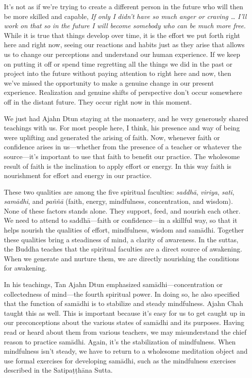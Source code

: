 It's not as if we're trying to create a different person in the future 
who will then be more skilled and capable, \emph{If only I didn't have 
so much anger or craving \ldots{} I'll work on that so in the future I 
will become somebody who can be much more free.} While it is true that 
things develop over time, it is the effort we put forth right here and 
right now, seeing our reactions and habits just as they arise that 
allows us to change our perceptions and understand our human 
experience. If we keep on putting it off or spend time regretting all 
the things we did in the past or project into the future without paying 
attention to right here and now, then we've missed the opportunity to 
make a genuine change in our present experience. Realization and 
genuine shifts of perspective don't occur somewhere off in the distant 
future. They occur right now in this moment.


We just had Ajahn Dtun staying at the monastery, and he very generously 
shared teachings with us. For most people here, I think, his presence 
and way of being were uplifting and generated the arising of faith. 
Now, whenever faith or confidence arises in us---whether from the 
presence of a teacher or whatever the source---it's important to use 
that faith to benefit our practice. The wholesome result of faith is 
the inclination to apply effort or energy. In this way faith is 
nourishment for effort and energy in our practice.

These two qualities are among the five spiritual faculties: 
\emph{saddhā}, \emph{viriya}, \emph{sati}, \emph{samādhi}, and 
\emph{paññā} (faith, energy, mindfulness, concentration, and 
wisdom). None of these factors stands alone. They support, feed, and 
nourish each other. We need to attend to saddhā---faith or 
confidence---in a skillful way, so that it helps nourish the qualities 
of effort, mindfulness, wisdom and samādhi. Together these qualities 
bring a steadiness of mind, a clarity of awareness. In the suttas, the 
Buddha teaches that the spiritual faculties are a direct source of 
awakening. When we generate and nurture them, we are directly 
nourishing the conditions for awakening.

In his teachings, Tan Ajahn Dtun emphasized samādhi---concentration or 
collectedness of mind---the fourth spiritual power. In doing so, he 
also specified that the function of samādhi is to stabilize and steady 
mindfulness. Ajahn Chah taught this as well. This is important because 
it's easy for us to get caught up in our preconceptions about the 
various states of samādhi and its purposes. Having read or heard about 
them from various teachers, we may misunderstand the chief reason to 
practice samādhi. Again, it's the stabilization of mindfulness. When 
mindfulness isn't steady, we have to return to a wholesome meditation 
object and use formal exercises for developing samādhi, such as the 
mindfulness exercises described in the Satipaṭṭhāna Sutta.

